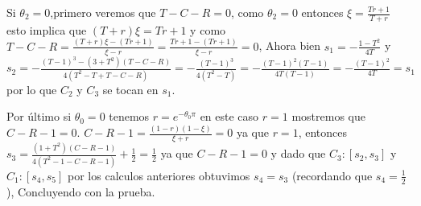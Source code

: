 \documentclass[11pt]{report}
\theoremstyle{definition}
\theoremstyle{remark}
\begin{document}
Si $\theta_{2} = 0$,primero veremos que $T-C-R = 0$, como $\theta_{2}=0$ entonces $\xi = \frac{Tr +1}{ T + r}$ esto implica que $(T+r) \xi = Tr +1$ y como $T-C-R = \frac{(T+r)\xi - (Tr+1)}{ \xi -r} = \frac{Tr+1 - ( Tr+1)}{\xi - r} =0$, Ahora bien $s_{1} = -\frac{1-T^{2}}{4T}$ y $s_{2} = -\frac{(T-1)^{3} - (3 + T^{2})(T-C-R)}{ 4(T^{2} - T + T-C-R)} =- \frac{(T-1)^{3}}{4(T^{2} - T)} =- \frac{(T-1)^{2} (T-1)}{4T (T-1)} = -\frac{(T-1)^{2}}{4T}= s_{1} $ por lo que $C_{2}$ y $C_{3}$ se tocan en $s_{1}$.

Por \'ultimo si $\theta_{0} = 0$ tenemos $r=e^{-\theta_{0} \pi }$ en este caso $r = 1$ mostremos que $C-R-1=0$. $C-R-1 = \frac{(1-r)(1- \xi)}{ \xi + r}= 0$ ya que $r = 1$, entonces $ s_{3} = \frac{(1+T^{2})(C-R-1)}{ 4(T^{2} -1 -C-R-1)} + \frac{1}{2} = \frac{1}{2}$ ya que $C-R-1 = 0$ y dado que $C_{3}:[s_{2},s_{3}]$ y  $ C_{1}:[s_{4},s_{5}]$ por los calculos anteriores obtuvimos $s_{4}= s_{3}$ (recordando que $s_{4} = \frac{1}{2}$), Concluyendo con la prueba.
 
\end{document}
